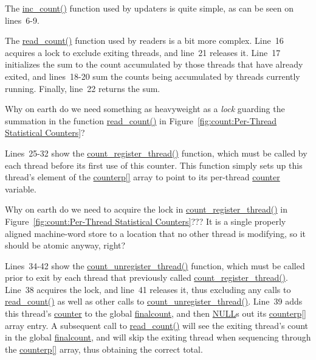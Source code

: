 The \url{inc_count()} function used by updaters is quite simple, as can
be seen on lines~6-9.

The \url{read_count()} function used by readers is a bit more complex.
Line~16 acquires a lock to exclude exiting threads, and line~21 releases
it.
Line~17 initializes the sum to the count accumulated by those threads that
have already exited, and lines~18-20 sum the counts being accumulated
by threads currently running.
Finally, line~22 returns the sum.

\QuickQuiz{}
	Why on earth do we need something as heavyweight as a \emph{lock}
	guarding the summation in the function \url{read_count()} in
	Figure~\ref{fig:count:Per-Thread Statistical Counters}?
 \QuickQuizEnd

Lines~25-32 show the \url{count_register_thread()} function, which
must be called by each thread before its first use of this counter.
This function simply sets up this thread's element of the \url{counterp[]}
array to point to its per-thread \url{counter} variable.

\QuickQuiz{}
	Why on earth do we need to acquire the lock in
	\url{count_register_thread()} in
	Figure~\ref{fig:count:Per-Thread Statistical Counters}???
	It is a single properly aligned machine-word store to a location
	that no other thread is modifying, so it should be atomic anyway,
	right?
 \QuickQuizEnd

Lines~34-42 show the \url{count_unregister_thread()} function, which
must be called prior to exit by each thread that previously called
\url{count_register_thread()}.
Line~38 acquires the lock, and line~41 releases it, thus excluding any
calls to \url{read_count()} as well as other calls to
\url{count_unregister_thread()}.
Line~39 adds this thread's \url{counter} to the global \url{finalcount},
and then \url{NULL}s out its \url{counterp[]} array entry.
A subsequent call to \url{read_count()} will see the exiting thread's
count in the global \url{finalcount}, and will skip the exiting thread
when sequencing through the \url{counterp[]} array, thus obtaining
the correct total.

